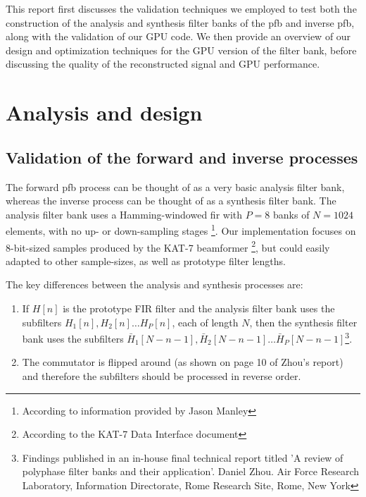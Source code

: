 \documentclass[a4paper,10pt]{article}
\begin{document}
This report first discusses the validation techniques we employed to test both the construction of the analysis and synthesis filter banks of the \gls{pfb} and inverse \gls{pfb}, 
along with the validation of our GPU code. We then provide an overview of our design and optimization techniques for the GPU version of the filter bank, before discussing the quality of 
the reconstructed signal and GPU performance.
\section{Analysis and design}
\subsection{Validation of the forward and inverse processes}
The forward \gls{pfb} process can be thought of as a very basic analysis filter bank, whereas the inverse process can be thought of as a synthesis filter bank. The 
analysis filter bank uses a Hamming-windowed \gls{fir} with $P=8$ banks of $N=1024$ elements, with no up- or down-sampling stages \footnote{According to information provided by Jason Manley}.
Our implementation focuses on 8-bit-sized samples produced by the KAT-7 beamformer \footnote{According to the KAT-7 Data Interface document}, but could easily adapted to other sample-sizes,
as well as prototype filter lengths.

The key differences between the analysis and synthesis processes are:
\begin{enumerate}
 \item If $H[n]$ is the prototype FIR filter and the analysis filter bank uses the subfilters $H_1[n], H_2[n] \dots H_P[n]$, each of length $N$, then the synthesis filter bank
 uses the subfilters $\bar H_1[N-n-1], \bar H_2[N-n-1] \dots \bar H_P[N-n-1]$\footnote{Findings published in an in-house final technical report titled 'A review of polyphase filter 
 banks and their application'. Daniel Zhou. Air Force Research Laboratory, Information Directorate, Rome Research Site, Rome, New York}.
 \item The commutator is flipped around (as shown on page 10 of Zhou's report) and therefore the subfilters should be processed in reverse order.
\end{enumerate}
\end{document}
